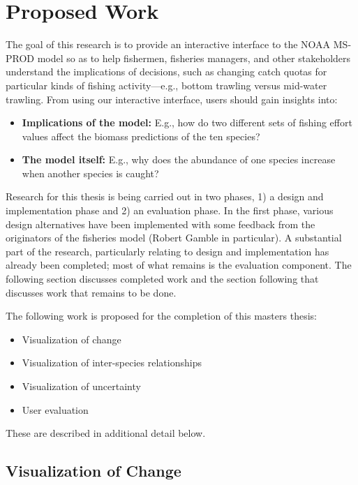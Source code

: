 \chapter{Proposed Work}

The goal of this research is to provide an interactive interface to the NOAA MS-PROD model so as to help fishermen, fisheries managers, and other stakeholders understand the implications of decisions, such as changing catch quotas for particular kinds of fishing activity---e.g., bottom trawling versus mid-water trawling.  From using our interactive interface, users should gain insights into:
\begin{itemize}
	\item \textbf{Implications of the model:}  E.g., how do two different sets of fishing effort values affect the biomass predictions of the ten species?
	\item \textbf{The model itself:}  E.g., why does the abundance of one species increase when another species is caught? 
\end{itemize}

Research for this thesis is being carried out in two phases, 1) a design and implementation phase and 2) an evaluation phase.  In the first phase, various design alternatives have been implemented with some feedback from the originators of the fisheries model (Robert Gamble in particular).  A substantial part of the research, particularly relating to design and implementation has already been completed; most of what remains is the evaluation component.  The following section discusses completed work and the section following that discusses work that remains to be done.%

The following work is proposed for the completion of this masters thesis:

\begin{itemize}
  \item Visualization of change
  \item Visualization of inter-species relationships
  \item Visualization of uncertainty
  \item User evaluation
\end{itemize}

These are described in additional detail below.

\section{Visualization of Change}

